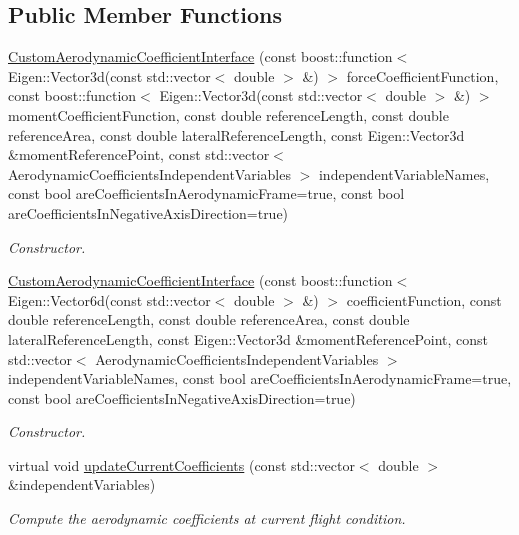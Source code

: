 \subsection*{Public Member Functions}
\begin{DoxyCompactItemize}
\item 
\hyperlink{classtudat_1_1aerodynamics_1_1CustomAerodynamicCoefficientInterface_ae2ba3219487bd5e0dfa9df55ec960953}{Custom\+Aerodynamic\+Coefficient\+Interface} (const boost\+::function$<$ Eigen\+::\+Vector3d(const std\+::vector$<$ double $>$ \&) $>$ force\+Coefficient\+Function, const boost\+::function$<$ Eigen\+::\+Vector3d(const std\+::vector$<$ double $>$ \&) $>$ moment\+Coefficient\+Function, const double reference\+Length, const double reference\+Area, const double lateral\+Reference\+Length, const Eigen\+::\+Vector3d \&moment\+Reference\+Point, const std\+::vector$<$ Aerodynamic\+Coefficients\+Independent\+Variables $>$ independent\+Variable\+Names, const bool are\+Coefficients\+In\+Aerodynamic\+Frame=true, const bool are\+Coefficients\+In\+Negative\+Axis\+Direction=true)
\begin{DoxyCompactList}\small\item\em Constructor. \end{DoxyCompactList}\item 
\hyperlink{classtudat_1_1aerodynamics_1_1CustomAerodynamicCoefficientInterface_a7db4e8365b5b080439d046d074e7f46a}{Custom\+Aerodynamic\+Coefficient\+Interface} (const boost\+::function$<$ Eigen\+::\+Vector6d(const std\+::vector$<$ double $>$ \&) $>$ coefficient\+Function, const double reference\+Length, const double reference\+Area, const double lateral\+Reference\+Length, const Eigen\+::\+Vector3d \&moment\+Reference\+Point, const std\+::vector$<$ Aerodynamic\+Coefficients\+Independent\+Variables $>$ independent\+Variable\+Names, const bool are\+Coefficients\+In\+Aerodynamic\+Frame=true, const bool are\+Coefficients\+In\+Negative\+Axis\+Direction=true)
\begin{DoxyCompactList}\small\item\em Constructor. \end{DoxyCompactList}\item 
virtual void \hyperlink{classtudat_1_1aerodynamics_1_1CustomAerodynamicCoefficientInterface_acaea0cdace6817da63eccc5c33a3d5ee}{update\+Current\+Coefficients} (const std\+::vector$<$ double $>$ \&independent\+Variables)
\begin{DoxyCompactList}\small\item\em Compute the aerodynamic coefficients at current flight condition. \end{DoxyCompactList}\end{DoxyCompactItemize}
